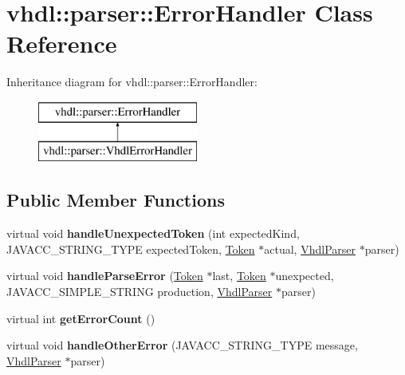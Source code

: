 \hypertarget{classvhdl_1_1parser_1_1_error_handler}{}\section{vhdl\+::parser\+::Error\+Handler Class Reference}
\label{classvhdl_1_1parser_1_1_error_handler}
Inheritance diagram for vhdl\+::parser\+::Error\+Handler\+:\begin{figure}[H]
\begin{center}
\leavevmode
\includegraphics[height=2.000000cm]{classvhdl_1_1parser_1_1_error_handler}
\end{center}
\end{figure}
\subsection*{Public Member Functions}
\begin{DoxyCompactItemize}
\item 
\mbox{\label{classvhdl_1_1parser_1_1_error_handler_a58996681d4319784030e5a34cf87533a}} 
virtual void {\bfseries handle\+Unexpected\+Token} (int expected\+Kind, J\+A\+V\+A\+C\+C\+\_\+\+S\+T\+R\+I\+N\+G\+\_\+\+T\+Y\+PE expected\+Token, \mbox{\hyperlink{classvhdl_1_1parser_1_1_token}{Token}} $\ast$actual, \mbox{\hyperlink{classvhdl_1_1parser_1_1_vhdl_parser}{Vhdl\+Parser}} $\ast$parser)
\item 
\mbox{\label{classvhdl_1_1parser_1_1_error_handler_a645a82411f50d046fce4566f2ba41186}} 
virtual void {\bfseries handle\+Parse\+Error} (\mbox{\hyperlink{classvhdl_1_1parser_1_1_token}{Token}} $\ast$last, \mbox{\hyperlink{classvhdl_1_1parser_1_1_token}{Token}} $\ast$unexpected, J\+A\+V\+A\+C\+C\+\_\+\+S\+I\+M\+P\+L\+E\+\_\+\+S\+T\+R\+I\+NG production, \mbox{\hyperlink{classvhdl_1_1parser_1_1_vhdl_parser}{Vhdl\+Parser}} $\ast$parser)
\item 
\mbox{\label{classvhdl_1_1parser_1_1_error_handler_a8c83075a30c8b0ad7eca7aa59621a202}} 
virtual int {\bfseries get\+Error\+Count} ()
\item 
\mbox{\label{classvhdl_1_1parser_1_1_error_handler_af9d5d4fada8902d1ec7737054aab58b5}} 
virtual void {\bfseries handle\+Other\+Error} (J\+A\+V\+A\+C\+C\+\_\+\+S\+T\+R\+I\+N\+G\+\_\+\+T\+Y\+PE message, \mbox{\hyperlink{classvhdl_1_1parser_1_1_vhdl_parser}{Vhdl\+Parser}} $\ast$parser)
\end{DoxyCompactItemize}
